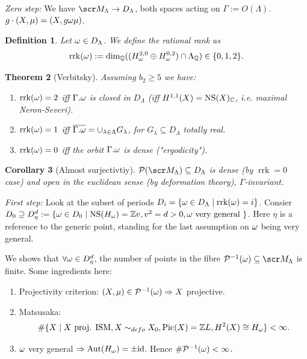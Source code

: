 \documentclass[A4paper, british, reqno]{amsart}
\theoremstyle{darkgreentheorem}
\newtheorem{thm}{Theorem}[section]
\newtheorem{cor}[thm]{Corollary}
\theoremstyle{darkbluedefinition}
\newtheorem{defn}[thm]{Definition}
\theoremstyle{darkredexample}
\theoremstyle{remark}
\DeclareMathOperator{\Pic}{Pic}
\DeclareMathOperator{\Aut}{Aut}
\newcommand{\1}{\mathbbm{1}}
\newcommand{\op}{\oplus}
\newcommand{\id}{\mathrm{id}}
\newcommand{\sub}{\subseteq}
\begin{document}
\textit{Zero step:}
We have $\M_{\Lambda}\to D_{\Lambda}$, both spaces acting on $\Gamma:=O(\Lambda)$.
$g\cdot (X,\mu)=(X,g\omega \mu)$.

\begin{defn}
    Let $\omega\in D_{\Lambda}$.
    We define the \textit{rational rank} as
    \[ \operatorname{rrk}(\w):=\dim_{\Q}((H^{2,0}_{\w}\op H^{0,2}_{\w})\cap \Lambda_{\Q})\in \{0,1,2\}. \]
\end{defn}

\begin{thm}[Verbitsky]
    Assuming $b_{2}\geqslant 5$ we have:
    \begin{enumerate}
	\item $\operatorname{rrk}(\omega)=2$ iff $\Gamma .\omega$ is closed in $D_{\Lambda}$ (iff $H^{1,1}(X)=\operatorname{NS}(X)_{\mathbb{C}}$, i.e. maximal Neron-Severi).
	\item $\operatorname{rrk}(\omega)=1$ iff $\overline{\Gamma .\omega}=\cup_{\lambda\in \Lambda}G_{\lambda}$, for $G_{\lambda}\sub D_{\Lambda}$ totally real.
	\item $\operatorname{rrk}(\omega)=0$ iff the orbit $\Gamma .\omega$ is dense ("ergodicity").
    \end{enumerate}
\end{thm}

\begin{cor}[Almost surjectivtiy]
    $\calP(\M_{\Lambda})\sub D_{\Lambda}$ is dense (by $\operatorname{rrk}=0$ case) and open in the euclidean sense (by deformation theory), $\Gamma$-invariant.
\end{cor}

\textit{First step:}
Look at the subset of periods $D_{i}=\{\omega\in D_{\Lambda}\mid \operatorname{rrk}(\omega)=i \}$.
Consier $D_{0}\supseteq D_{\eta}^{d}:=\{ \omega\in D_{0}\mid \operatorname{NS}(H_{\omega})=\mathbb{Z} v, v^{2}=d>0, \omega \text{ very general }\}$.
Here $\eta$ is a reference to the generic point, standing for the last assumption on $\omega$ being very general.

We shows that $\forall \omega\in D_{\eta}^{d}$, the number of points in the fibre $\calP^{-1}(\w)\sub \M_{\Lambda}$ is finite.
Some ingredients here:
\begin{enumerate}
    \item Projectivity criterion: $(X,\mu)\in \mathcal{P}^{-1}(\omega)\Rightarrow X$ projective.
    \item Matsusaka:
	\[ \# \{ X\mid X \text{ proj. ISM}, X\sim_{defo}X_{0},\Pic(X)=\Z L, H^{2}(X)\cong H_{\w}\} < \infty. \]
    \item $\omega$ very general $\Rightarrow \Aut(H_{\w})=\pm \id$.
	Hence $\# \mathcal{P}^{-1}(\omega) < \infty$.
\end{enumerate}
\end{document}
